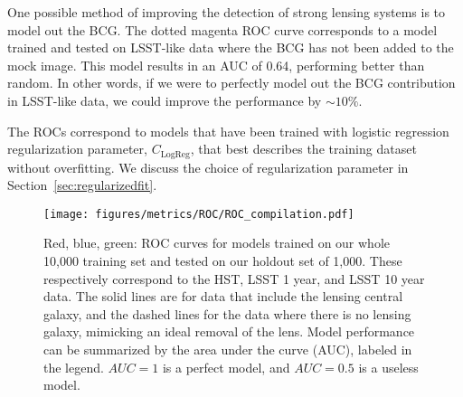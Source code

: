 \documentclass{emulateapj}
\begin{document}
One possible method of improving the detection of strong lensing
systems is to model out the BCG.  The dotted magenta ROC curve
corresponds to a model trained and tested on LSST-like data where the
BCG has not been added to the mock image.  This model results in an
AUC of 0.64, performing better than random.  In other words, if we
were to perfectly model out the BCG contribution in LSST-like data, we
could improve the performance by $\sim10\%$.

The ROCs correspond to models that have been trained with logistic
regression regularization parameter, $C_\text{LogReg}$, that best
describes the training dataset without overfitting.  We discuss the
choice of regularization parameter in
Section~\ref{sec:regularizedfit}.

\begin{figure}[t]\label{fig:ROCcompilation}
\begin{center}
\texttt{[image: figures/metrics/ROC/ROC\_compilation.pdf]}
\caption{Red, blue, green: ROC curves for models trained on our whole
  10,000 training set and tested on our holdout set of 1,000.  These
  respectively correspond to the HST, LSST 1 year, and LSST 10 year
  data.  The solid lines are for data that include the lensing central
  galaxy, and the dashed lines for the data where there is no lensing
  galaxy, mimicking an ideal removal of the lens.  Model performance
  can be summarized by the area under the curve (AUC), labeled in the
  legend. $AUC=1$ is a perfect model, and $AUC=0.5$ is a useless
  model.}
\end{center}
\end{figure}
\end{document}
